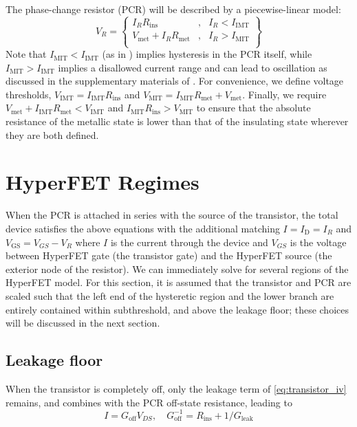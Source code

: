 \documentclass[letterpaper]{article}
\newcommand{\VGS}{\ensuremath{V_\mathrm{GS}}}
\newcommand{\ID}{\ensuremath{I_\mathrm{D}}}
\newcommand{\IMIT}{\ensuremath{I_\mathrm{MIT}}}
\newcommand{\IIMT}{\ensuremath{I_\mathrm{IMT}}}
\newcommand{\Rins}{\ensuremath{R_\mathrm{ins}}}
\newcommand{\Rmet}{\ensuremath{R_\mathrm{met}}}
\begin{document}
The phase-change resistor (PCR) will be described by a piecewise-linear model:
\begin{equation}
V_R=\left\{\begin{array}{llr}
I_R\Rins &, & I_R < \IIMT \\
V_\mathrm{met}+I_R\Rmet &, & I_R > \IMIT \\
\end{array}\right\}
\label{eq:PCR_iv}
\end{equation}
Note that $\IMIT <\IIMT $ (as in \cite{Kumar_2013}) implies hysteresis in the PCR itself, while $\IMIT >\IIMT $ implies a disallowed current range and can lead to oscillation as discussed in the supplementary materials of \cite{Shukla_2015}.  For convenience, we define voltage thresholds, $V_\mathrm{IMT}=\IIMT \Rins $ and $V_\mathrm{MIT}=\IMIT \Rmet +V_\mathrm{met}$.  Finally, we require $V_\mathrm{met}+\IIMT \Rmet <V_\mathrm{IMT}$ and $\IMIT \Rins >V_\mathrm{MIT}$ to ensure that the absolute resistance of the metallic state is lower than that of the insulating state wherever they are both defined.

\section{HyperFET Regimes}
When the PCR is attached in series with the source of the transistor, the total device satisfies the above equations with the additional matching $I=\ID=I_R$ and $\VGS=V_{GS}-V_R$ where $I$ is the current through the device and $V_{GS}$ is the voltage between HyperFET gate (the transistor gate) and the HyperFET source (the exterior node of the resistor).  We can immediately solve for several regions of the HyperFET model.  For this section, it is assumed that the transistor and PCR are scaled such that the left end of the hysteretic region and the lower branch are entirely contained within subthreshold, and above the leakage floor; these choices will be discussed in the next section.

\subsection{Leakage floor}
When the transistor is completely off, only the leakage term of \eqref{eq:transistor_iv} remains, and combines with the PCR off-state resistance, leading to
\begin{equation}
I=G_\mathrm{off}V_{DS},\quad G_\mathrm{off}^{-1}=\Rins +1/G_\mathrm{leak}
\end{equation}
\end{document}

